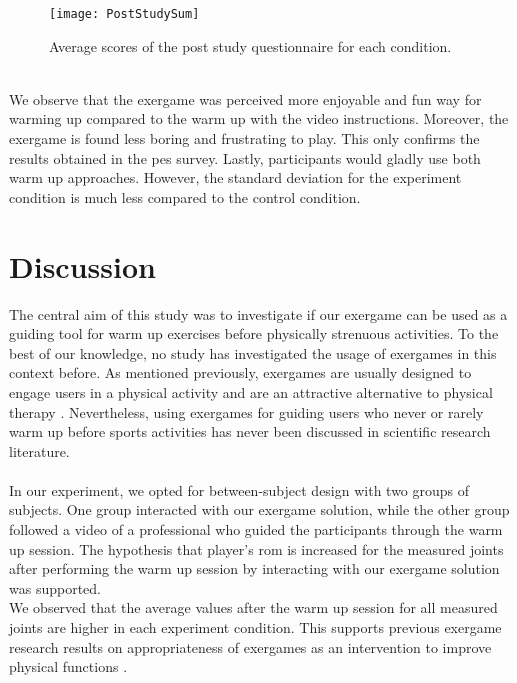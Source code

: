 \begin{figure}[h]
    \centering
    \texttt{[image: PostStudySum]}
    \caption{Average scores of the post study questionnaire for each condition.}
    \label{fig:poststudysum}
\end{figure}\\ We observe that the exergame was perceived more enjoyable and fun way for warming up compared to the warm up with the video instructions. Moreover, the exergame is found less boring and frustrating to play.  This only confirms the results obtained in the \acrshort{pes} survey. Lastly, participants would gladly use both warm up approaches. However, the standard deviation for the experiment condition is much less compared to the control condition.
\section{Discussion}
The central aim of this study was to investigate if our exergame can be used as a guiding tool for warm up exercises before physically strenuous activities. To the best of our knowledge, no study has investigated the usage of exergames in this context before. As mentioned previously, exergames are usually designed to engage users in a physical activity \cite{song2010effects, staiano2011exergames} and are an attractive alternative to physical therapy \cite{jansen2013serious}. Nevertheless, using exergames for guiding users who never or rarely warm up before sports activities has never been discussed in scientific research literature. \\\\
In our experiment, we opted for between-subject design with two groups of subjects. One group interacted with our exergame solution, while the other group followed a video of a professional who guided the participants through the warm up session. The hypothesis that player's \acrshort{rom} is increased for the measured joints after performing the warm up session by interacting with our exergame solution was supported. \\We observed that the average values after the warm up session for all measured joints are higher in each experiment condition. This supports previous exergame research results on appropriateness  of exergames  as an intervention to improve physical functions \cite{skjaeret2016exercise}. %
